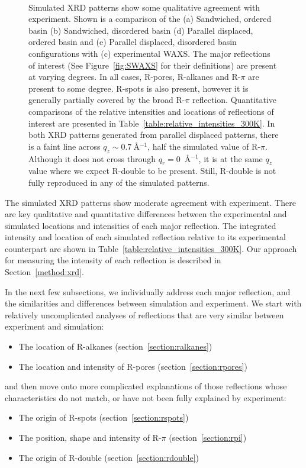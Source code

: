 \documentclass[journal=jpcbfk,manuscript=article]{achemso}
\begin{document}
\begin{figure}[!htb]
\begin{subfigure}{0.1\textwidth}
	\end{subfigure}	
	\caption{Simulated XRD patterns show some qualitative agreement with
		experiment. Shown is a comparison of the (a) Sandwiched, ordered basin (b)
		Sandwiched, disordered basin (d) Parallel displaced, ordered basin and (e)
		Parallel displaced, disordered basin configurations with (c) experimental WAXS.
		The major reflections of interest (See Figure~\ref{fig:SWAXS} for their
		definitions) are present at varying degrees. In all cases, R-pores, R-alkanes
		and R-$\pi$ are present to some degree. R-spots is also present, however it is
		generally partially covered by the broad R-$\pi$ reflection. Quantitative
		comparisons of the relative intensities and locations of reflections of
		interest are presented in Table~\ref{table:relative_intensities_300K}. In both
		XRD patterns generated from parallel displaced patterns, there is a faint line
		across $q_z \sim 0.7~$\AA$^{-1}$, half the simulated value of R-$\pi$. Although
		it does not cross through $q_r = 0$~\AA$^{-1}$, it is at the same $q_z$ value
		where we expect R-double to be present. Still, R-double is not fully reproduced
		in any of the simulated patterns.}~\label{fig:XRDsim} 
  \end{figure}
  
  The simulated XRD patterns show moderate agreement with experiment. There 
  are key qualitative and quantitative differences between the experimental and simulated
  locations and intensities of each major reflection. The integrated intensity and location
  of each simulated reflection relative to its experimental counterpart are shown in  
  Table~\ref{table:relative_intensities_300K}. Our approach for measuring the intensity of
  each reflection is described in Section~\ref{method:xrd}. 

  In the next few subsections, we individually address each major reflection, and the
  similarities and differences between simulation and experiment. We start with relatively 
  uncomplicated analyses of reflections that are very similar between experiment and simulation:
  \begin{itemize}
  	\item The location of R-alkanes (section~\ref{section:ralkanes})
  	\item The location and intensity of R-pores (section~\ref{section:rpores})
  \end{itemize}
  and then move onto more complicated explanations of those reflections whose characteristics
  do not match, or have not been fully explained by experiment:
  \begin{itemize}
  	\item The origin of R-spots (section~\ref{section:rspots})
  	\item The position, shape and intensity of R-$\pi$ (section~\ref{section:rpi})
  	\item The origin of R-double (section~\ref{section:rdouble})
  \end{itemize}
  
\end{document}
